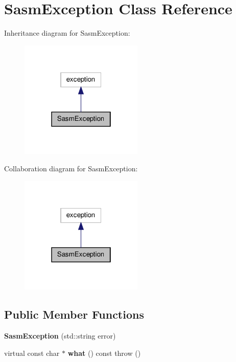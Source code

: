 \hypertarget{class_sasm_exception}{\section{Sasm\-Exception Class Reference}
\label{class_sasm_exception}
}


Inheritance diagram for Sasm\-Exception\-:\nopagebreak
\begin{figure}[H]
\begin{center}
\leavevmode
\includegraphics[width=166pt]{class_sasm_exception__inherit__graph}
\end{center}
\end{figure}


Collaboration diagram for Sasm\-Exception\-:\nopagebreak
\begin{figure}[H]
\begin{center}
\leavevmode
\includegraphics[width=166pt]{class_sasm_exception__coll__graph}
\end{center}
\end{figure}
\subsection*{Public Member Functions}
\begin{DoxyCompactItemize}
\item 
\hypertarget{class_sasm_exception_a8dc2efb5bb0228356e8133667d1fa412}{{\bfseries Sasm\-Exception} (std\-::string error)}\label{class_sasm_exception_a8dc2efb5bb0228356e8133667d1fa412}

\item 
\hypertarget{class_sasm_exception_aa83c903b08e11cc8b633f8b118f2ab5a}{virtual const char $\ast$ {\bfseries what} () const   throw ()}\label{class_sasm_exception_aa83c903b08e11cc8b633f8b118f2ab5a}

\end{DoxyCompactItemize}


